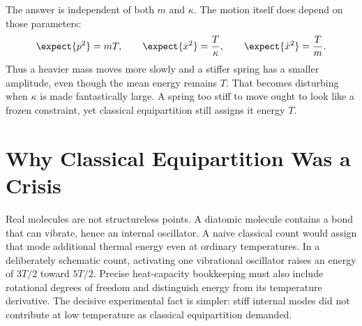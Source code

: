 The answer is independent of both \(m\) and \(\kappa\).  The motion itself
does depend on those parameters:
\begin{equation}
 \expect{p^2}=mT,
 \qquad
 \expect{x^2}=\frac{T}{\kappa},
 \qquad
 \expect{\dot{x}^2}=\frac{T}{m}.
 \label{eq:sm7-classical-fluctuations}
\end{equation}
Thus a heavier mass moves more slowly and a stiffer spring has a smaller
amplitude, even though the mean energy remains \(T\).
That becomes disturbing when \(\kappa\) is made fantastically large.  A
spring too stiff to move ought to look like a frozen constraint, yet
classical equipartition still assigns it energy \(T\).

\begin{classroomqa}
\end{classroomqa}

\begin{classroomqa}
\end{classroomqa}

\section{Why Classical Equipartition Was a Crisis}

Real molecules are not structureless points.  A diatomic molecule contains a
bond that can vibrate, hence an internal oscillator.  A naive classical count
would assign that mode additional thermal energy even at ordinary
temperatures.  In a deliberately schematic count, activating one vibrational
oscillator raises an energy of \(3T/2\) toward \(5T/2\).  Precise
heat-capacity bookkeeping must also include rotational degrees of freedom and
distinguish energy from its temperature derivative.  The decisive
experimental fact is simpler:
stiff internal modes did not contribute at low temperature as classical
equipartition demanded.

